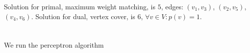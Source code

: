 \documentclass[a4paper,11pt,oneside,onecolumn]{article}
\begin{document}
Solution for primal, maximum weight matching, is $5$, edges: $(v_1, v_3)$, $(v_2, v_5)$, $(v_4, v_6)$. Solution for dual, vertex
cover, is $6$, $\forall v \in V: p(v) = 1$.

\section{}

We run the perceptron algorithm 
\end{document}
